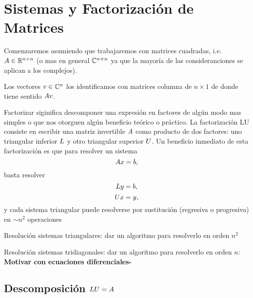 \chapter{Sistemas y Factorización de Matrices}

Comenzaremos asumiendo que trabajaremos con matrices cuadradas, i.e.  $\Ab\in \R^{n\times n}$ (o mas en general
$\mathbb C^{n\times n}$ ya que la mayoría de las consideranciones se aplican a los complejos).

Los vectores $\vb\in \Cn$ los identificamos con matrices columna de $n\times 1$ de donde tiene sentido $\Ab\vb$.

Factorizar siginifica descomponer una expresión en factores de algún modo mas simples o que nos otorguen algún beneficio teórico o práctico. La factorización
LU consiste en escribir una matriz invertible $\Ab$ como producto de dos factores: uno triangular inferior $\Lb$ y otro triangular superior $\Ub$. Un beneficio inmediato de esta factorización es que para  resolver un sistema
$$
\Ab\xb=\bb,
$$
basta resolver
$$
\Lb\yb=\bb,
$$
$$
\Ub\xb=\yb,
$$
y cada sistema triangular puede resolverse por sustitución (regresiva o progresiva) en $\sim n^2$ operaciones
\begin{ej}Resolución sistemas triangulares: dar un algoritmo para resolverlo en orden $n^2$
\end{ej}
\begin{ej}Resolución sistemas tridiagonales: dar un algoritmo para resolverlo en orden $n$:
{\bf Motivar con ecuaciones diferenciales-}
\end{ej}

\section{Descomposición $\Lb\Ub=\Ab$}

